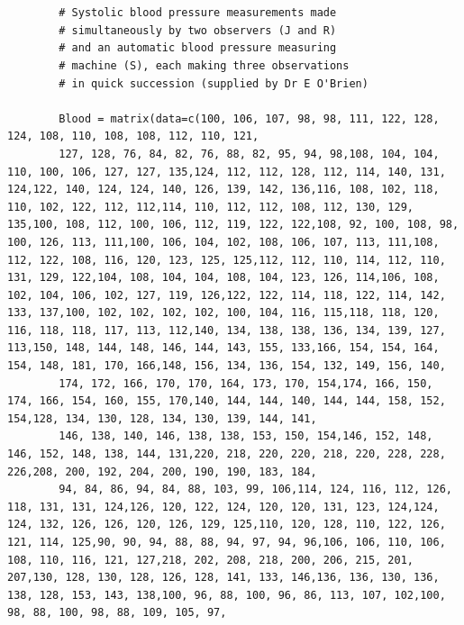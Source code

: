 \documentclass[12pt, a4paper]{report}
\theoremstyle{plain}
\theoremstyle{definition}
\theoremstyle{remark}
\begin{document}
	\begin{framed}	\begin{verbatim}	
		
		
		# Systolic blood pressure measurements made 
		# simultaneously by two observers (J and R) 
		# and an automatic blood pressure measuring
		# machine (S), each making three observations 
		# in quick succession (supplied by Dr E O'Brien)
		
		Blood = matrix(data=c(100, 106, 107, 98, 98, 111, 122, 128, 124, 108, 110, 108, 108, 112, 110, 121, 
		127, 128, 76, 84, 82, 76, 88, 82, 95, 94, 98,108, 104, 104, 110, 100, 106, 127, 127, 135,124, 112, 112, 128, 112, 114, 140, 131, 124,122, 140, 124, 124, 140, 126, 139, 142, 136,116, 108, 102, 118, 110, 102, 122, 112, 112,114, 110, 112, 112, 108, 112, 130, 129, 135,100, 108, 112, 100, 106, 112, 119, 122, 122,108, 92, 100, 108, 98, 100, 126, 113, 111,100, 106, 104, 102, 108, 106, 107, 113, 111,108, 112, 122, 108, 116, 120, 123, 125, 125,112, 112, 110, 114, 112, 110, 131, 129, 122,104, 108, 104, 104, 108, 104, 123, 126, 114,106, 108, 102, 104, 106, 102, 127, 119, 126,122, 122, 114, 118, 122, 114, 142, 133, 137,100, 102, 102, 102, 102, 100, 104, 116, 115,118, 118, 120, 116, 118, 118, 117, 113, 112,140, 134, 138, 138, 136, 134, 139, 127, 113,150, 148, 144, 148, 146, 144, 143, 155, 133,166, 154, 154, 164, 154, 148, 181, 170, 166,148, 156, 134, 136, 154, 132, 149, 156, 140,
		174, 172, 166, 170, 170, 164, 173, 170, 154,174, 166, 150, 174, 166, 154, 160, 155, 170,140, 144, 144, 140, 144, 144, 158, 152, 154,128, 134, 130, 128, 134, 130, 139, 144, 141,
		146, 138, 140, 146, 138, 138, 153, 150, 154,146, 152, 148, 146, 152, 148, 138, 144, 131,220, 218, 220, 220, 218, 220, 228, 228, 226,208, 200, 192, 204, 200, 190, 190, 183, 184,
		94, 84, 86, 94, 84, 88, 103, 99, 106,114, 124, 116, 112, 126, 118, 131, 131, 124,126, 120, 122, 124, 120, 120, 131, 123, 124,124, 124, 132, 126, 126, 120, 126, 129, 125,110, 120, 128, 110, 122, 126, 121, 114, 125,90, 90, 94, 88, 88, 94, 97, 94, 96,106, 106, 110, 106, 108, 110, 116, 121, 127,218, 202, 208, 218, 200, 206, 215, 201, 207,130, 128, 130, 128, 126, 128, 141, 133, 146,136, 136, 130, 136, 138, 128, 153, 143, 138,100, 96, 88, 100, 96, 86, 113, 107, 102,100, 98, 88, 100, 98, 88, 109, 105, 97,

\end{verbatim}
\end{framed}
\end{document}
